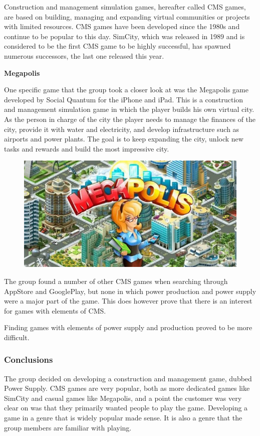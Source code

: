 Construction and management simulation games, hereafter called CMS games, are based on building, managing and expanding virtual communities or projects with limited resources. CMS games have been developed since the 1980s and continue to be popular to this day. SimCity, which was released in 1989 and is considered to be the first CMS game to be highly successful, has spawned numerous successors, the last one released this year. \cite{wikiCMS}

{\bf Megapolis}

One specific game that the group took a closer look at was the Megapolis game developed by Social Quantum for the iPhone and iPad. This is a construction and management simulation game in which the player builds his own virtual city. As the person in charge of the city the player needs to manage the finances of the city, provide it with water and electricity, and develop infrastructure such as airports and power plants. The goal is to keep expanding the city, unlock new tasks and rewards and build the most impressive city. \cite{megapolis}

\begin{figure}[H]
	\centering
	\includegraphics[width=\textwidth]{pictures/megapolis.jpg}
\end{figure}

The group found a number of other CMS games when searching through AppStore and GooglePlay, but none in which power production and power supply were a major part of the game. This does however prove that there is an interest for games
with elements of CMS.

Finding games with elements of power supply and production proved to be more difficult.

\subsubsection{Conclusions}

The group decided on developing a construction and management game, dubbed Power Supply. CMS games are very popular, both as more dedicated games like SimCity and casual games like Megapolis, and a point the customer was very clear on was that they primarily wanted people to play the game. Developing a game in a genre that is widely popular made sense. It is also a genre that the group members are familiar with playing.
